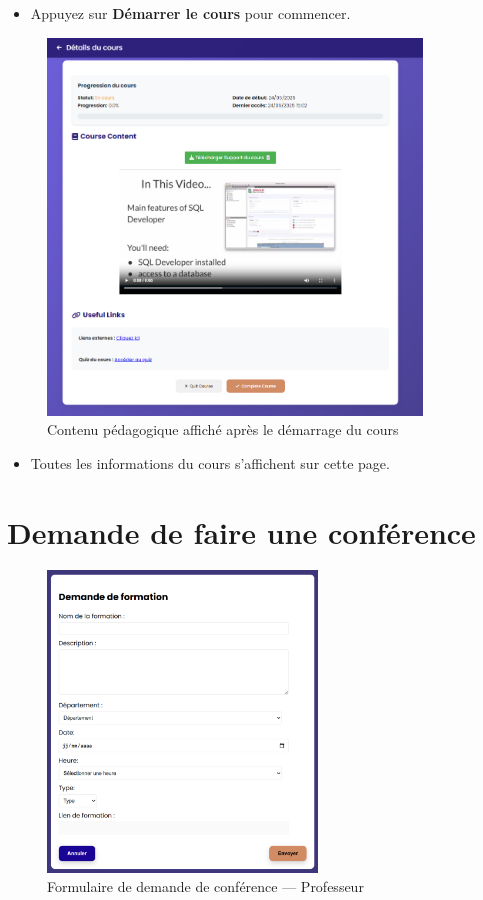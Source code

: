 \documentclass{article}
\begin{document}
\begin{itemize}
    \item Appuyez sur \textbf{Démarrer le cours} pour commencer.
\end{itemize}
\begin{figure}[H]
  \centering
  \includegraphics[height=10cm]{COURS-MATERIEL.png}
  \caption{Contenu pédagogique affiché après le démarrage du cours}
  \label{fig:cours-materiel}
\end{figure}
\begin{itemize}
    \item Toutes les informations du cours s'affichent sur cette page.
\end{itemize}
\section*{Demande de faire une conférence}
\begin{figure}[H]
  \centering
  \includegraphics[height=8cm]{DEM-CON.png}
  \caption{Formulaire de demande de conférence — Professeur}
  \label{fig:demande-conf}
\end{figure}
\end{document}
